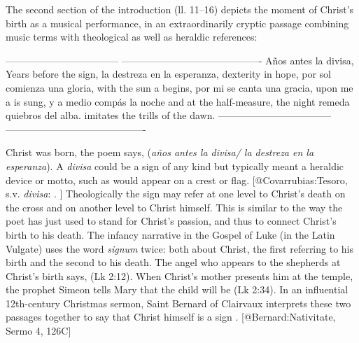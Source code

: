 The second section of the introduction (ll. 11--16) depicts the moment of
Christ's birth as a musical performance, in an extraordinarily cryptic passage
combining music terms with theological as well as heraldic references:

----------------------------------- -------------------------------------------
Años antes la divisa,               Years before the sign,
la destreza en la esperanza,        dexterity in hope,
por sol comienza una gloria,        with the sun  a  begins,
por mi se canta una gracia,         upon me  a  is sung,
y a medio compás la noche           and at the half-measure, the night
remeda quiebros del alba.           imitates the trills of the dawn.
----------------------------------- -------------------------------------------

Christ was born, the poem says, 
(\emph{años antes la divisa/ la destreza en la esperanza}).
A \emph{divisa} could be a sign of any kind but typically meant a heraldic device or
motto, such as would appear on a crest or flag.
[@Covarrubias:Tesoro, s.v. \emph{divisa}: . ]
Theologically the sign may refer at one level to Christ's death on the cross and
on another level to Christ himself.
This is similar to the way the poet has just used  to stand
for Christ's passion, and thus to connect Christ's birth to his death.
The infancy narrative in the Gospel of Luke (in the Latin Vulgate) uses the word
\emph{signum} twice: both about Christ, the first referring to his birth and the
second to his death.
The angel who appears to the shepherds at Christ's birth says,  (Lk 2:12).
When Christ's mother presents him at the temple, the prophet Simeon tells Mary
that the child will be  (Lk 2:34).
In an influential 12th-century Christmas sermon, Saint Bernard of Clairvaux
interprets these two passages together to say that Christ himself is a sign
.
[@Bernard:Nativitate, Sermo 4, 126C]

